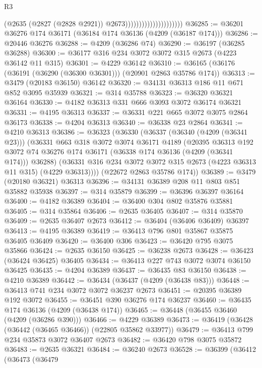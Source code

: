 \begin{lexlean}{R3}
\begin{coremodule}
                                            (@2635 (@2827 (@2828 @2921)) @2673)))))))))))))))))))))
@36285 := @36201 @36276 @174 @36171 (@36184 @174 @36136 (@4209 (@36187 @174)))
@36286 := @20446 @36276
@36288 := @4209 (@36286 @74)
@36290 := @36197 (@36285 @36288)
@36300 := @36177 @316 @234 @3072 @3072 @315 @2673 (@4223 @36142 @11 @315)
@36301 := @4229 @36142
@36310 := @36165 (@36176 (@36191 (@36290 (@36300 @36301))) (@20901 @2863 @35786 @174))
@36313 := @3479 (@20183 @36150) @36142
@36320 := @34131 @36313 @186 @11 @671 @852 @3095 @35939
@36321 := @314 @35788
@36323 := @36320 @36321 @36164
@36330 := @4182 @36313 @331 @666 @3093 @3072 @36174 @36321
@36331 := @4195 @36313
@36337 := @36331 @221 @665 @3072 @3075 @2864 @36173
@36338 := @4204 @36313
@36340 := @36338 @23 @2864
@36341 := @4210 @36313
@36386 := @36323
    (@36330
      (@36337
        (@36340 (@4209 (@36341 @23)))
        (@36331
          @663
          @318
          @3072
          @3074
          @36171
          @4189
          (@20395
            @36313
            @192
            @3072
            @74
            @36276
            @174
            @36171
            (@36338 @174 @36136 (@4209 (@36341 @174)))
            @36288)
          (@36331 @316 @234 @3072 @3072 @315 @2673 (@4223 @36313 @11 @315) (@4229 @36313))))
      (@22672 @2863 @35786 @174))
@36389 := @3479 (@20180 @36321) @36313
@36396 := @34131 @36389 @208 @11 @803 @851 @35882 @35938
@36397 := @314 @35879
@36399 := @36396 @36397 @36164
@36400 := @4182 @36389
@36404 := @36400 @304 @802 @35876 @35881
@36405 := @314 @35864
@36406 := @2635 @36405
@36407 := @314 @35870
@36409 := @2635 @36407 @2673
@36412 := @36404 (@36406 @36409) @36397
@36413 := @4195 @36389
@36419 := @36413 @796 @801 @35867 @35875 @36405 @36409
@36420 := @36400 @306
@36423 := @36420 @795 @3075 @35866
@36424 := @2635 @36150
@36425 := @36238 @2673
@36428 := @36423 (@36424 @36425) @36405
@36434 := @36413 @227 @743 @3072 @3074 @36150 @36425
@36435 := @4204 @36389
@36437 := @36435 @83 @36150
@36438 := @4210 @36389
@36442 := @36434 (@36437 (@4209 (@36438 @83)))
@36448 := @36413 @741 @234 @3072 @3072 @36237 @2673
@36451 := @20395 @36389 @192 @3072
@36455 := @36451 @390 @36276 @174 @36237
@36460 := @36435 @174 @36136 (@4209 (@36438 @174))
@36465 := @36448 (@36455 @36460 (@4209 (@36286 @390)))
@36466 := @4229 @36389
@36473 := @36419 (@36428 (@36442 (@36465 @36466)) (@22805 @35862 @33977))
@36479 := @36413 @799 @234 @35873 @3072 @36407 @2673
@36482 := @36420 @798 @3075 @35872
@36483 := @2635 @36321
@36484 := @36240 @2673
@36528 := @36399
    (@36412
      (@36473
        (@36479

\end{coremodule}
\end{lexlean}
